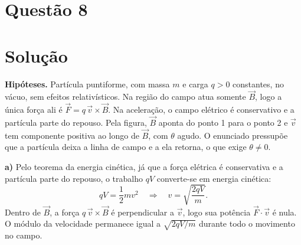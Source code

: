 \documentclass{article}%
\begin{document}
\section*{Questão 8}

\section*{Solução}

\textbf{Hipóteses.} Partícula puntiforme, com massa $m$ e carga $q>0$ constantes, no vácuo, sem efeitos relativísticos. Na região do campo atua somente $\vec{B}$, logo a única força ali é $\vec{F}=q\,\vec{v}\times\vec{B}$. Na aceleração, o campo elétrico é conservativo e a partícula parte do repouso. Pela figura, $\vec{B}$ aponta do ponto 1 para o ponto 2 e $\vec{v}$ tem componente positiva ao longo de $\vec{B}$, com $\theta$ agudo. O enunciado pressupõe que a partícula deixa a linha de campo e a ela retorna, o que exige $\theta\neq 0$.

\textbf{a)} Pelo teorema da energia cinética, já que a força elétrica é conservativa e a partícula parte do repouso, o trabalho $qV$ converte-se em energia cinética:
\[
qV=\frac{1}{2}mv^{2}\quad\Rightarrow\quad v=\sqrt{\frac{2qV}{m}}.
\]
Dentro de $\vec{B}$, a força $q\,\vec{v}\times\vec{B}$ é perpendicular a $\vec{v}$, logo sua potência $\vec{F}\cdot\vec{v}$ é nula. O módulo da velocidade permanece igual a $\sqrt{2qV/m}$ durante todo o movimento no campo.
\end{document}
